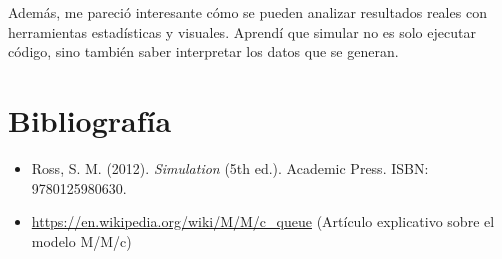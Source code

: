 \documentclass[12pt]{article}
\begin{document}
Además, me pareció interesante cómo se pueden analizar resultados reales con herramientas estadísticas y visuales. Aprendí que simular no es solo ejecutar código, sino también saber interpretar los datos que se generan.
\section*{Bibliografía}

\begin{itemize}
  \item Ross, S. M. (2012). \textit{Simulation} (5th ed.). Academic Press. ISBN: 9780125980630.
  
  \item \url{https://en.wikipedia.org/wiki/M/M/c_queue}  
  (Artículo explicativo sobre el modelo M/M/c)

\end{itemize}
\end{document}
